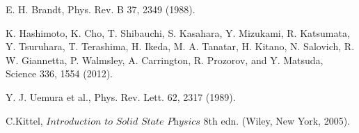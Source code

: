 \documentclass[reprint, superscriptaddress, secnumarabic, amssymb, nobibnotes, aps, prl]{revtex4-1}
\begin{document}
\begin{thebibliography}{References}
 E. H. Brandt, Phys. Rev. B 37, 2349 (1988).

 K. Hashimoto, K. Cho, T. Shibauchi, S. Kasahara, Y. Mizukami, R. Katsumata, Y. Tsuruhara, T. Terashima, H. Ikeda, M. A.
Tanatar, H. Kitano, N. Salovich, R. W. Giannetta, P. Walmsley, A. Carrington, R. Prozorov, and Y. Matsuda, Science 336, 1554 (2012).

 Y. J. Uemura et al., Phys. Rev. Lett. 62, 2317 (1989).

 C.Kittel, $\textit{Introduction to Solid State Physics}$ 8th edn. (Wiley, New York, 2005).








\end{thebibliography}
\end{document}
